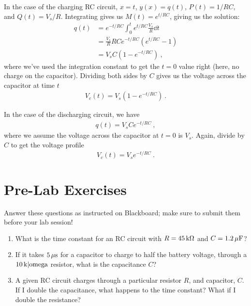 \documentclass[12pt]{article}
\begin{document}
In the case of the charging RC circuit, $x = t$, $y(x) = q(t)$, $P(t)
= 1/RC$, and $Q(t) = V_s/R$.  Integrating gives us $M(t) = e^{t/RC}$,
giving us the solution:
\begin{align*}
  q(t) &= e^{-t/RC} \int_0^t e^{t/RC} \frac{V_s}{R} \dd t\\
  &= \frac{V_s}{R} RC e^{-t/RC} \left( e^{t/RC} -1 \right)\\
  &= V_s C \left( 1 - e^{-t/RC} \right)\ ,
\end{align*}
where we've used the integration constant to get the $t=0$ value right
(here, no charge on the capacitor).  Dividing both sides by $C$ gives
us the voltage across the capacitor at time $t$
\begin{gather*}
  V_c(t) = V_s \left( 1 - e^{-t/RC} \right)\ .
\end{gather*}

In the case of the discharging circuit, we have 
\begin{gather*}
  q(t) = V_s C e^{-t/RC}\ ,
\end{gather*}
where we assume the voltage across the capacitor at $t=0$ is $V_s$.
Again, divide by $C$ to get the voltage profile
\begin{gather*}
  V_c(t) = V_s e^{-t/RC}\ .
\end{gather*}

\newpage

\section*{Pre-Lab Exercises}

Answer these questions as instructed on Blackboard; make sure to
submit them before your lab session!

\begin{enumerate}
\item What is the time constant for an RC circuit with $R =
  \unit[45]{k\Omega}$ and $C = \unit[1.2]{\mu F}$?
\item If it takes $\unit[5]{\mu s}$ for a capacitor to charge to half
  the battery voltage, through a $\unit[10]{k|omega}$ resistor, what
  is the capacitance $C$?
\item A given RC circuit charges through a particular resistor $R$,
  and capacitor, $C$.  If I double the capacitance, what happens to
  the time constant?  What if I double the resistance?
\end{enumerate}

\newpage
\end{document}
